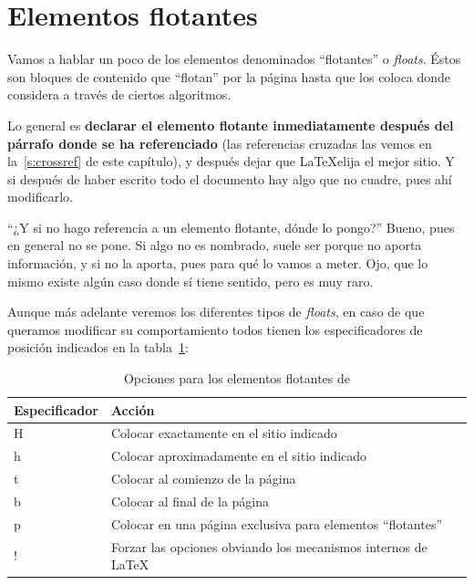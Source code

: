 \documentclass[%
    school=etsisi,%
    degree=61TI,%
]{upm-report}
\begin{document}
\section{Elementos flotantes}

Vamos a hablar un poco de los elementos denominados \enquote{flotantes} o \textit{floats}. Éstos son bloques de contenido que \enquote{flotan} por la página hasta que  los coloca donde considera a través de ciertos algoritmos.

Lo general es \textbf{declarar el elemento flotante inmediatamente después del párrafo donde se ha referenciado} (las referencias cruzadas las vemos en la~\autoref{s:crossref} de este capítulo), y después dejar que \LaTeX\space elija el mejor sitio. Y si después de haber escrito todo el documento hay algo que no cuadre, pues ahí modificarlo.

\enquote{¿Y si no hago referencia a un elemento flotante, dónde lo pongo?} Bueno, pues en general no se pone. Si algo no es nombrado, suele ser porque no aporta información, y si no la aporta, pues para qué lo vamos a meter. Ojo, que lo mismo existe algún caso donde sí tiene sentido, pero es muy raro.

Aunque más adelante veremos los diferentes tipos de \textit{floats}, en caso de que queramos modificar su comportamiento todos tienen los especificadores de posición indicados en la tabla~\ref{tab:floats-options}:

\begin{table}
    \caption{\label{tab:floats-options}Opciones para los elementos flotantes de }
    \centering
    \begin{tabularx}{\textwidth}{@{}lX@{}}
        \toprule
        \textbf{Especificador} & \textbf{Acción} \\
        \midrule
        H & Colocar exactamente en el sitio indicado                       \\
        h & Colocar aproximadamente en el sitio indicado                   \\
        t & Colocar al comienzo de la página                               \\
        b & Colocar al final de la página                                  \\
        p & Colocar en una página exclusiva para elementos ``flotantes''   \\
        ! & Forzar las opciones obviando los mecanismos internos de \LaTeX \\
    \bottomrule
    \end{tabularx}
\end{table}
\end{document}
